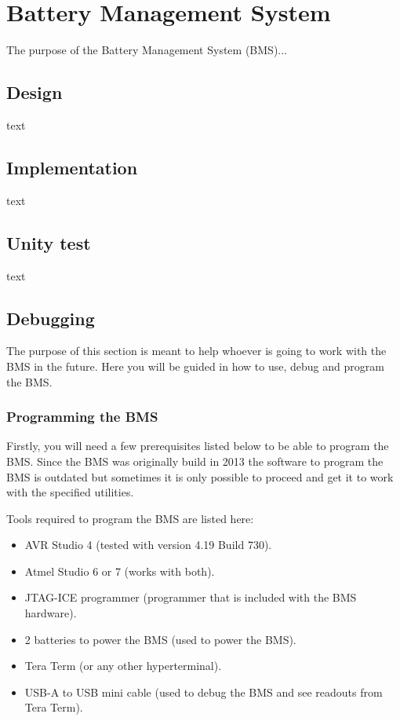 \section{Battery Management System}
The purpose of the Battery Management System (BMS)...

\subsection{Design}
text

\subsection{Implementation}
text

\subsection{Unity test}
text

\subsection{Debugging}
The purpose of this section is meant to help whoever is going to work with the BMS in the future. Here you will be guided in how to use, debug and program the BMS.

\subsubsection{Programming the BMS}
Firstly, you will need a few prerequisites listed below to be able to program the BMS. Since the BMS was originally build in 2013 the software to program the BMS is outdated but sometimes it is only possible to proceed and get it to work with the specified utilities. 

Tools required to program the BMS are listed here:
	\begin{itemize}
		\item AVR Studio 4 (tested with version 4.19 Build 730).
		\item Atmel Studio 6 or 7 (works with both).
		\item JTAG-ICE programmer	(programmer that is included with the BMS hardware).
		\item 2 batteries to power the BMS (used to power the BMS).
		\item Tera Term (or any other hyperterminal).
		\item USB-A to USB mini cable	(used to debug the BMS and see readouts from Tera Term).
	\end{itemize}

